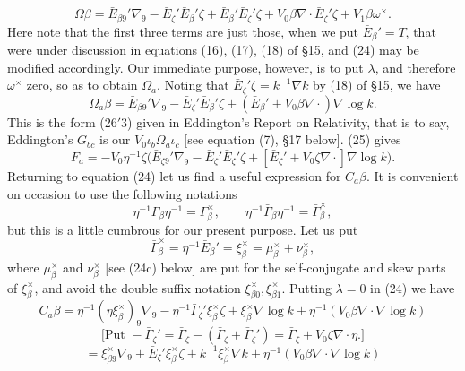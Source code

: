 \documentclass[11pt]{article}
\begin{document}
\begin{equation}\Omega\beta=\bar E_{\beta9}'\nabla_9-\bar E_\zeta'\bar E_\beta'\zeta+\bar E_\beta'\bar E_\zeta'\zeta+V_0\beta\nabla\mathbin{\cdot}\bar E_\zeta'\zeta+V_1\beta\omega^\times.\tag{24}\end{equation}
Here note that the first three terms are just those, when we put $\bar E_\beta'=T$, that were under discussion in equations (16), (17), (18) of \S15, and (24) may be modified accordingly. Our immediate purpose, however, is to put $\lambda$, and therefore $\omega^\times$ zero, so as to obtain $\Omega_a$. Noting that $\bar E_\zeta'\zeta=k^{-1}\nabla k$ by (18) of \S15, we have
\begin{equation}\Omega_a\beta=\bar E_{\beta9}'\nabla_9-\bar E_\zeta'\bar E_\beta'\zeta+(\bar E_\beta'+V_0\beta\nabla\mathbin{\cdot})\nabla\log k.\tag{25}\end{equation}
This is the form (26$'$3) given in Eddington's Report on Relativity, that is to say, Eddington's $G_{bc}$ is our $V_0\iota_b\Omega_a\iota_c$ [see equation (7), \S17 below]. (25) gives
\begin{equation}F_a=-V_0\eta^{-1}\zeta\bigl(\bar E_{\zeta9}'\nabla_9-\bar E_\zeta'\bar E_\zeta'\zeta+[\bar E_\zeta'+V_0\zeta\nabla\mathbin{\cdot}]\nabla\log k\bigr).\tag{26}\end{equation}
\indent Returning to equation (24) let us find a useful expression for $C_a\beta$. It is convenient on occasion to use the following notations
\[
\eta^{-1}\Gamma_\beta\eta^{-1}=\Gamma_\beta^\times,\qquad \eta^{-1}\bar\Gamma_\beta\eta^{-1}=\bar\Gamma_\beta^\times,
\]
but this is a little cumbrous for our present purpose. Let us put
\begin{equation}\bar\Gamma_\beta^\times=\eta^{-1}\bar E_\beta'=\xi_\beta^\times=\mu_\beta^\times+\nu_\beta^\times,\tag{24a}\end{equation}
where $\mu_\beta^\times$ and $\nu_\beta^\times$ [see (24c) below] are put for the self-conjugate and skew parts of $\xi_\beta^\times$, and avoid the double suffix notation $\xi_{\beta0}^\times,\xi_{\beta1}^\times$. Putting $\lambda=0$ in (24) we have
\[
C_a\beta=\eta^{-1}(\eta\xi_\beta^\times)_9\nabla_9-\eta^{-1}\bar\Gamma_\zeta'\xi_\beta^\times\zeta+\xi_\beta^\times\nabla\log k+\eta^{-1}(V_0\beta\nabla\mathbin{\cdot}\nabla\log k)
\]
\[
\text{[Put }-\bar\Gamma_\zeta'=\bar\Gamma_\zeta-(\bar\Gamma_\zeta+\bar\Gamma_\zeta')=\bar\Gamma_\zeta+V_0\zeta\nabla\mathbin{\cdot}\eta\text{.]}
\]
\[
=\xi_{\beta9}^\times\nabla_9+\bar E_\zeta'\xi_\beta^\times\zeta+k^{-1}\xi_\beta^\times\nabla k+\eta^{-1}(V_0\beta\nabla\mathbin{\cdot}\nabla\log k)
\]
\end{document}
